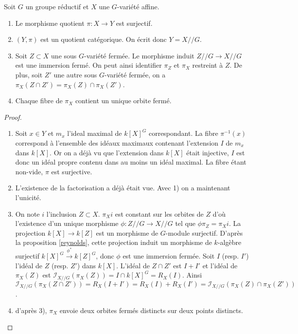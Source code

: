 \begin{thm}\label{goodquotientthm}
Soit $G$ un groupe réductif et $X$ une $G$-variété affine.
\begin{enumerate}
\item Le morphisme quotient $\pi:X\rightarrow Y$ est surjectif.
\item $(Y, \pi)$ est un quotient catégorique. On écrit donc $Y=X//G$.
\item Soit $Z\subset X$ une sous $G$-variété fermée. Le morphisme induit $Z//G \rightarrow X//G$ est une immersion fermé. On peut ainsi identifier $\pi_Z$ et $\pi_X$ restreint à $Z$. De plus, soit $Z'$ une autre sous $G$-variété fermée, on a $\pi_X(Z\cap Z')=\pi_X(Z)\cap\pi_X(Z')$.
\item Chaque fibre de $\pi_X$ contient un unique orbite fermé.
\end{enumerate}
\end{thm}
\begin{proof}
\begin{enumerate}
\item Soit $x\in Y$ et $m_x$ l'ideal maximal de $k[X]^G$ correspondant. La fibre $\pi^{-1}(x)$ correspond à l'ensemble des idéaux maximaux contenant l'extension $I$ de $m_x$ dans $k[X]$. Or on a déjà vu que l'extension dans $k[X]$ était injective, $I$ est donc un idéal propre contenu dans au moins un idéal maximal. La fibre étant non-vide, $\pi$ est surjective.
\item L'existence de la factorisation a déjà était vue. Avec 1) on a maintenant l'unicité.
\item On note $i$ l'inclusion $Z\subset X$. $\pi_Xi$ est constant sur les orbites de $Z$ d'où l'existence d'un unique morphisme $\phi:Z//G\rightarrow X//G$ tel que $\phi\pi_Z=\pi_Xi$. La projection $k[X] \rightarrow k[Z]$ est un morphisme de $G$-module surjectif. D'après la proposition \ref{reynolds}, cette projection induit un morphisme de $k$-algèbre surjectif $k[X]^G \xrightarrow{\phi^*} k[Z]^G$, donc $\phi$ est une immersion fermée.
Soit $I$ (resp. $I'$) l'idéal de $Z$ (resp. $Z'$) dans $k[X]$. L'idéal de $Z\cap Z'$ est $I+I'$ et l'idéal de $\pi_X(Z)$ est $\mathcal{I}_{X//G}(\pi_X(Z))=I\cap k[X]^G=R_X(I)$. Ainsi $\mathcal{I}_{X//G}(\pi_X(Z\cap Z'))=R_X(I+I')=R_X(I)+R_X(I')=\mathcal{I}_{X//G}(\pi_X(Z)\cap \pi_X(Z'))$.
\item d'après 3), $\pi_X$ envoie deux orbites fermés distincts sur deux points distincts.
\end{enumerate}
\end{proof}

